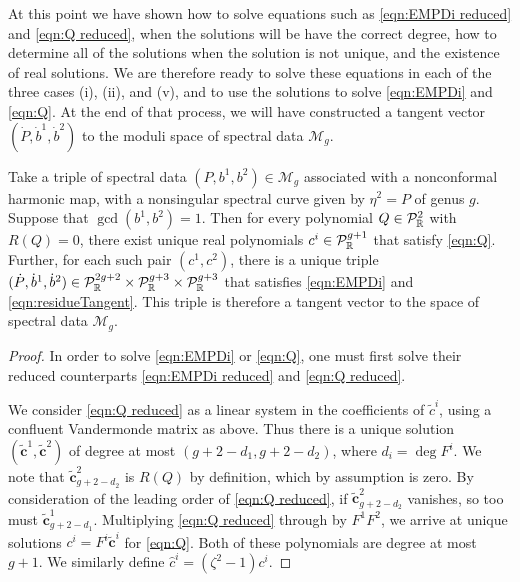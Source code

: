 \documentclass{article}
\begin{document}
At this point we have shown how to solve equations such as \eqref{eqn:EMPDi reduced} and \eqref{eqn:Q reduced}, when the solutions will be have the correct degree, how to determine all of the solutions when the solution is not unique, and the existence of real solutions. We are therefore ready to solve these equations in each of the three cases (i), (ii), and (v), and to use the solutions to solve \eqref{eqn:EMPDi} and \eqref{eqn:Q}. At the end of that process, we will have constructed a tangent vector $(\dot{P}, \dot{b}^1, \dot{b}^2)$ to the moduli space of spectral data $\mathcal{M}_g$.









\begin{lem}[Case (i)]
    \label{lem:tangent generic}
Take a triple of spectral data $(P,b^1,b^2)\in\mathcal{M}_g$ associated with a nonconformal harmonic map, with a nonsingular spectral curve given by $\eta^2 = P$ of genus $g$. Suppose that $\gcd(b^1,b^2) = 1$. Then for every polynomial $Q \in \mathcal{P}^2_{\mathbb{R}}$ with $R(Q) = 0$, there exist unique real polynomials $c^i\in\mathcal{P}^{g+1}_{\mathbb{R}}$ that satisfy \eqref{eqn:Q}. Further, for each such pair $(c^1,c^2)$, there is a unique triple $(\dot P, \dot b^1, \dot b^2) \in \mathcal{P}_{\mathbb{R}}^{2g+2}\times\mathcal{P}_{\mathbb{R}}^{g+3}\times\mathcal{P}_{\mathbb{R}}^{g+3}$ that satisfies \eqref{eqn:EMPDi} and \eqref{eqn:residueTangent}. This triple is therefore a tangent vector to the space of spectral data $\mathcal{M}_g$.

\begin{proof}
In order to solve \eqref{eqn:EMPDi} or \eqref{eqn:Q}, one must first solve their reduced counterparts \eqref{eqn:EMPDi reduced} and \eqref{eqn:Q reduced}.

We consider \eqref{eqn:Q reduced} as a linear system in the coefficients of $\tilde{c}^i$, using a confluent Vandermonde matrix as above. Thus there is a unique solution $(\mathbf{\tilde{c}}^1, \mathbf{\tilde{c}}^2)$ of degree at most $(g+2-d_1, g+2-d_2)$, where $d_i = \deg F^i$. We note that $\mathbf{\tilde{c}}^2_{g+2-d_2}$ is $R(Q)$ by definition, which by assumption is zero.
By consideration of the leading order of \eqref{eqn:Q reduced}, if $\mathbf{\tilde{c}}^2_{g+2-d_2}$ vanishes, so too must $\mathbf{\tilde{c}}^1_{g+2-d_1}$. Multiplying \eqref{eqn:Q reduced} through by $F^1F^2$, we arrive at unique solutions $c^i = F^i \mathbf{\tilde{c}}^i$ for \eqref{eqn:Q}. Both of these polynomials are degree at most $g+1$. We similarly define $\hat{c}^i = (\zeta^2 -1)c^i$.


\end{proof}
\end{lem}
\end{document}
